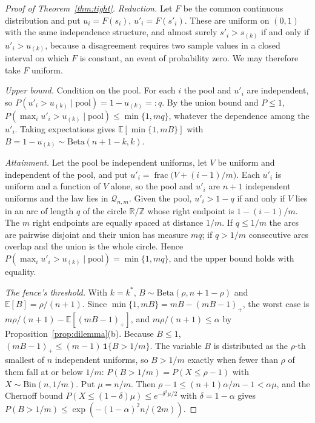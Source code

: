 \begin{proof}[Proof of Theorem~\ref{thm:tight}]
\emph{Reduction.} Let $F$ be the common continuous distribution and put $u_i=F(s_i)$, $u'_i=F(s'_i)$. These are uniform on $(0,1)$ with the same independence structure, and almost surely $s'_i>s_{(k)}$ if and only if $u'_i>u_{(k)}$, because a disagreement requires two sample values in a closed interval on which $F$ is constant, an event of probability zero. We may therefore take $F$ uniform.

\emph{Upper bound.} Condition on the pool. For each $i$ the pool and $u'_i$ are independent, so $P(u'_i>u_{(k)}\mid\text{pool})=1-u_{(k)}=:q$. By the union bound and $P\le1$, $P(\max_iu'_i>u_{(k)}\mid\text{pool})\le\min\{1,mq\}$, whatever the dependence among the $u'_i$. Taking expectations gives $\mathbb{E}[\min\{1,mB\}]$ with $B=1-u_{(k)}\sim\mathrm{Beta}(n+1-k,k)$.

\emph{Attainment.} Let the pool be independent uniforms, let $V$ be uniform and independent of the pool, and put $u'_i=\operatorname{frac}\big(V+(i-1)/m\big)$. Each $u'_i$ is uniform and a function of $V$ alone, so the pool and $u'_i$ are $n+1$ independent uniforms and the law lies in $\mathcal{Q}_{n,m}$. Given the pool, $u'_i>1-q$ if and only if $V$ lies in an arc of length $q$ of the circle $\mathbb{R}/\mathbb{Z}$ whose right endpoint is $1-(i-1)/m$. The $m$ right endpoints are equally spaced at distance $1/m$. If $q\le1/m$ the arcs are pairwise disjoint and their union has measure $mq$; if $q>1/m$ consecutive arcs overlap and the union is the whole circle. Hence $P(\max_iu'_i>u_{(k)}\mid\text{pool})=\min\{1,mq\}$, and the upper bound holds with equality.

\emph{The fence's threshold.} With $k=k^\ast$, $B\sim\mathrm{Beta}(\rho,n+1-\rho)$ and $\mathbb{E}[B]=\rho/(n+1)$. Since $\min\{1,mB\}=mB-(mB-1)_+$, the worst case is $m\rho/(n+1)-\mathbb{E}[(mB-1)_+]$, and $m\rho/(n+1)\le\alpha$ by Proposition~\ref{prop:dilemma}(b). Because $B\le1$, $(mB-1)_+\le(m-1)\,\mathbf{1}\{B>1/m\}$. The variable $B$ is distributed as the $\rho$-th smallest of $n$ independent uniforms, so $B>1/m$ exactly when fewer than $\rho$ of them fall at or below $1/m$: $P(B>1/m)=P(X\le\rho-1)$ with $X\sim\mathrm{Bin}(n,1/m)$. Put $\mu=n/m$. Then $\rho-1\le(n+1)\alpha/m-1<\alpha\mu$, and the Chernoff bound $P(X\le(1-\delta)\mu)\le e^{-\delta^2\mu/2}$ with $\delta=1-\alpha$ gives $P(B>1/m)\le\exp(-(1-\alpha)^2n/(2m))$.
\end{proof}

